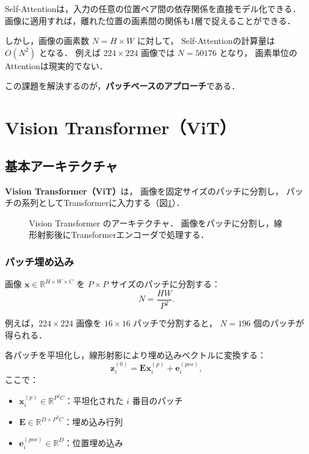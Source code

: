 Self-Attentionは，入力の任意の位置ペア間の依存関係を直接モデル化できる．
画像に適用すれば，離れた位置の画素間の関係も1層で捉えることができる．

しかし，画像の画素数 $N = H \times W$ に対して，
Self-Attentionの計算量は $O(N^2)$ となる．
例えば $224 \times 224$ 画像では $N = 50176$ となり，
画素単位のAttentionは現実的でない．

この課題を解決するのが，\textbf{パッチベースのアプローチ}である．

\section{Vision Transformer（ViT）}
\label{sec:vit}

\subsection{基本アーキテクチャ}

\textbf{Vision Transformer（ViT）}\cite{Dosovitskiy2020}は，
画像を固定サイズのパッチに分割し，
パッチの系列としてTransformerに入力する（図\ref{fig:vit-arch}）．

\begin{figure}[hbtp]
  \centering
  \caption{Vision Transformer のアーキテクチャ．
  画像をパッチに分割し，線形射影後にTransformerエンコーダで処理する．}
  \label{fig:vit-arch}
\end{figure}

\subsubsection{パッチ埋め込み}

画像 $\mathbf{x} \in \mathbb{R}^{H \times W \times C}$ を
$P \times P$ サイズのパッチに分割する：
\begin{equation}
  N = \frac{HW}{P^2}.
\end{equation}

例えば，$224 \times 224$ 画像を $16 \times 16$ パッチで分割すると，
$N = 196$ 個のパッチが得られる．

各パッチを平坦化し，線形射影により埋め込みベクトルに変換する：
\begin{equation}
  \boldsymbol{z}_i^{(0)} = \mathbf{E} \boldsymbol{x}_i^{(p)} + \boldsymbol{e}_i^{(pos)},
  \label{eq:patch-embed}
\end{equation}
ここで：
\begin{itemize}
  \item $\boldsymbol{x}_i^{(p)} \in \mathbb{R}^{P^2 C}$：平坦化された $i$ 番目のパッチ
  \item $\mathbf{E} \in \mathbb{R}^{D \times P^2 C}$：埋め込み行列
  \item $\boldsymbol{e}_i^{(pos)} \in \mathbb{R}^D$：位置埋め込み
\end{itemize}

